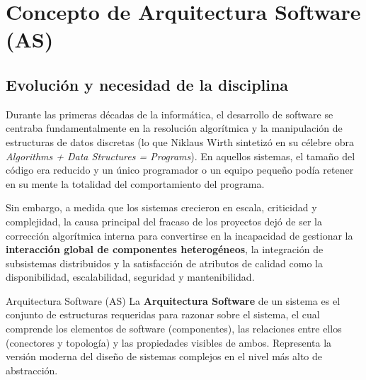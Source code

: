 \vspace{1em}

\section{Concepto de Arquitectura Software (AS)}
\label{sec:concepto-as}

\subsection{Evolución y necesidad de la disciplina}

Durante las primeras décadas de la informática, el desarrollo de software se centraba fundamentalmente en la resolución algorítmica y la manipulación de estructuras de datos discretas (lo que Niklaus Wirth sintetizó en su célebre obra \emph{Algorithms + Data Structures = Programs}). En aquellos sistemas, el tamaño del código era reducido y un único programador o un equipo pequeño podía retener en su mente la totalidad del comportamiento del programa.

Sin embargo, a medida que los sistemas crecieron en escala, criticidad y complejidad, la causa principal del fracaso de los proyectos dejó de ser la corrección algorítmica interna para convertirse en la incapacidad de gestionar la \textbf{interacción global de componentes heterogéneos}, la integración de subsistemas distribuidos y la satisfacción de atributos de calidad como la disponibilidad, escalabilidad, seguridad y mantenibilidad.

\begin{definicion}{Arquitectura Software (AS)}
La \textbf{Arquitectura Software} de un sistema es el conjunto de estructuras requeridas para razonar sobre el sistema, el cual comprende los elementos de software (componentes), las relaciones entre ellos (conectores y topología) y las propiedades visibles de ambos. Representa la versión moderna del diseño de sistemas complejos en el nivel más alto de abstracción.
\end{definicion}

